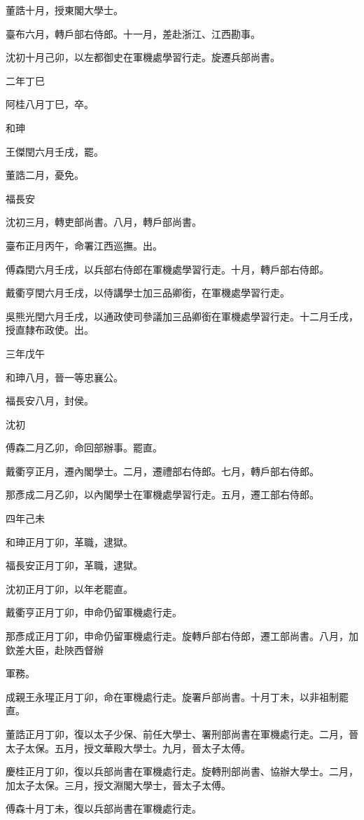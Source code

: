 \begin{pinyinscope}
董誥十月，授東閣大學士。

臺布六月，轉戶部右侍郎。十一月，差赴浙江、江西勘事。

沈初十月己卯，以左都御史在軍機處學習行走。旋遷兵部尚書。

二年丁巳

阿桂八月丁巳，卒。

和珅

王傑閏六月壬戌，罷。

董誥二月，憂免。

福長安

沈初三月，轉吏部尚書。八月，轉戶部尚書。

臺布正月丙午，命署江西巡撫。出。

傅森閏六月壬戌，以兵部右侍郎在軍機處學習行走。十月，轉戶部右侍郎。

戴衢亨閏六月壬戌，以侍講學士加三品卿銜，在軍機處學習行走。

吳熊光閏六月壬戌，以通政使司參議加三品卿銜在軍機處學習行走。十二月壬戌，授直隸布政使。出。

三年戊午

和珅八月，晉一等忠襄公。

福長安八月，封侯。

沈初

傅森二月乙卯，命回部辦事。罷直。

戴衢亨正月，遷內閣學士。二月，遷禮部右侍郎。七月，轉戶部右侍郎。

那彥成二月乙卯，以內閣學士在軍機處學習行走。五月，遷工部右侍郎。

四年己未

和珅正月丁卯，革職，逮獄。

福長安正月丁卯，革職，逮獄。

沈初正月丁卯，以年老罷直。

戴衢亨正月丁卯，申命仍留軍機處行走。

那彥成正月丁卯，申命仍留軍機處行走。旋轉戶部右侍郎，遷工部尚書。八月，加欽差大臣，赴陜西督辦

軍務。

成親王永瑆正月丁卯，命在軍機處行走。旋署戶部尚書。十月丁未，以非祖制罷直。

董誥正月丁卯，復以太子少保、前任大學士、署刑部尚書在軍機處行走。二月，晉太子太保。五月，授文華殿大學士。九月，晉太子太傅。

慶桂正月丁卯，復以兵部尚書在軍機處行走。旋轉刑部尚書、協辦大學士。二月，加太子太保。三月，授文淵閣大學士，晉太子太傅。

傅森十月丁未，復以兵部尚書在軍機處行走。


\end{pinyinscope}
